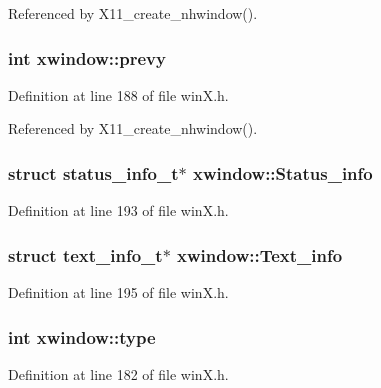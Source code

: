 Referenced by X11\+\_\+create\+\_\+nhwindow().

\hypertarget{structxwindow_a493627beb90e722882da46ed2227a30e}{
\subsubsection[{prevy}]{\setlength{\rightskip}{0pt plus 5cm}int xwindow\+::prevy}}\label{structxwindow_a493627beb90e722882da46ed2227a30e}


Definition at line 188 of file win\+X.\+h.



Referenced by X11\+\_\+create\+\_\+nhwindow().

\hypertarget{structxwindow_a9c2790da311e0b25973a5a59492a1eb5}{
\subsubsection[{Status\+\_\+info}]{\setlength{\rightskip}{0pt plus 5cm}struct {\bf status\+\_\+info\+\_\+t}$\ast$ xwindow\+::\+Status\+\_\+info}}\label{structxwindow_a9c2790da311e0b25973a5a59492a1eb5}


Definition at line 193 of file win\+X.\+h.

\hypertarget{structxwindow_a31ba56d6138d4ad8bdfc3a1c0ab152cd}{
\subsubsection[{Text\+\_\+info}]{\setlength{\rightskip}{0pt plus 5cm}struct {\bf text\+\_\+info\+\_\+t}$\ast$ xwindow\+::\+Text\+\_\+info}}\label{structxwindow_a31ba56d6138d4ad8bdfc3a1c0ab152cd}


Definition at line 195 of file win\+X.\+h.

\hypertarget{structxwindow_ae5bcb513f6ce2c64b180514ee0287c23}{
\subsubsection[{type}]{\setlength{\rightskip}{0pt plus 5cm}int xwindow\+::type}}\label{structxwindow_ae5bcb513f6ce2c64b180514ee0287c23}


Definition at line 182 of file win\+X.\+h.




